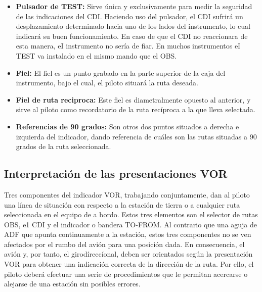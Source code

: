 \begin{itemize}
\item \textbf{Pulsador de TEST:} Sirve única y exclusivamente para medir la seguridad de las indicaciones del CDI. Haciendo uso del pulsador, el CDI sufrirá un desplazamiento determinado hacia uno de los lados del instrumento, lo cual indicará su buen funcionamiento. En caso de que el CDI no reaccionara de esta manera, eI instrumento no sería de fiar. En muchos instrumentos eI TEST va instalado en el mismo mando que el OBS.

\item \textbf{Fiel:} El fiel es un punto grabado en la parte superior de la caja del instrumento, bajo el cual, el piloto situará la ruta deseada.

\item \textbf{Fiel de ruta reciproca:} Este fiel es diametralmente opuesto al anterior, y sirve al piloto como recordatorio de la ruta recíproca a la que lleva selectada.

\item \textbf{Referencias de 90 grados:} Son otros dos puntos situados a derecha e izquierda del indicador, dando referencia de cuáles son las rutas situadas a 90 grados de la ruta seleccionada.


\end{itemize}



\subsection{Interpretación de las presentaciones VOR}

Tres componentes del indicador VOR, trabajando conjuntamente, dan al piloto una línea de situación con respecto a la estación de tierra o a cualquier ruta seleccionada en el equipo de a bordo. Estos tres elementos son el selector de rutas OBS, e1 CDI y el indicador o bandera TO-FROM. Al contrario que una aguja de ADF que apunta continuamente a la estación, estos tres componentes no se ven afectados por el rumbo del avión para una posición dada. En consecuencia, el avión y, por tanto, el girodíreccíonal, deben ser orientados según la presentación VOR para obtener una indicación correcta de la dirección de la ruta. Por ello, el piloto deberá efectuar una serie de procedimientos que le permitan acercarse o alejarse de una estación sin posibles errores.

